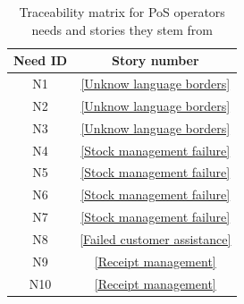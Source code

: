 \documentclass{article}
\begin{document}
\begin{table}[h]
\centering
\caption{Traceability matrix for PoS operators needs and stories they stem from}
\begin{tabular}{|c|c|}
\hline
\textbf{Need ID} & \textbf{Story number} \\ \hline
N1  & \ref{Unknow language borders} \\ \hline
N2  & \ref{Unknow language borders} \\ \hline
N3  & \ref{Unknow language borders} \\ \hline
N4  & \ref{Stock management failure} \\ \hline
N5  & \ref{Stock management failure} \\ \hline
N6  & \ref{Stock management failure} \\ \hline
N7  & \ref{Stock management failure} \\ \hline
N8  & \ref{Failed customer assistance} \\ \hline
N9  & \ref{Receipt management} \\ \hline
N10 & \ref{Receipt management} \\ \hline

\end{tabular}
\end{table}
\end{document}
